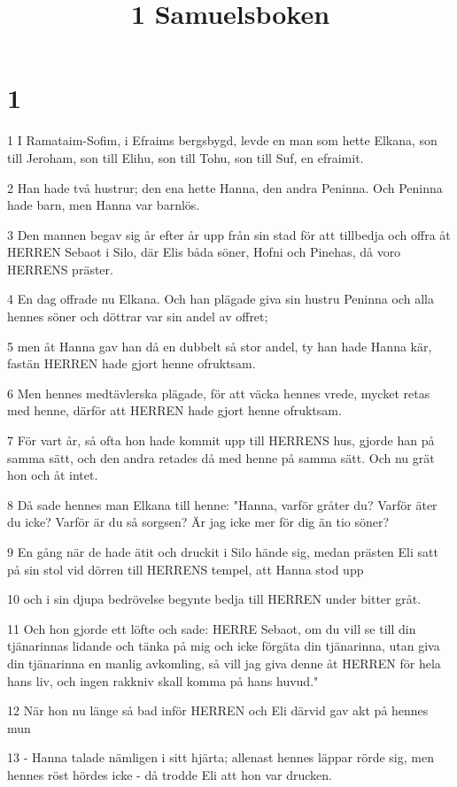 

\title{1 Samuelsboken}


\chapter{1}

\par 1 I Ramataim-Sofim, i Efraims bergsbygd, levde en man som hette Elkana, son till Jeroham, son till Elihu, son till Tohu, son till Suf, en efraimit.
\par 2 Han hade två hustrur; den ena hette Hanna, den andra Peninna. Och Peninna hade barn, men Hanna var barnlös.
\par 3 Den mannen begav sig år efter år upp från sin stad för att tillbedja och offra åt HERREN Sebaot i Silo, där Elis båda söner, Hofni och Pinehas, då voro HERRENS präster.
\par 4 En dag offrade nu Elkana. Och han plägade giva sin hustru Peninna och alla hennes söner och döttrar var sin andel av offret;
\par 5 men åt Hanna gav han då en dubbelt så stor andel, ty han hade Hanna kär, fastän HERREN hade gjort henne ofruktsam.
\par 6 Men hennes medtävlerska plägade, för att väcka hennes vrede, mycket retas med henne, därför att HERREN hade gjort henne ofruktsam.
\par 7 För vart år, så ofta hon hade kommit upp till HERRENS hus, gjorde han på samma sätt, och den andra retades då med henne på samma sätt. Och nu grät hon och åt intet.
\par 8 Då sade hennes man Elkana till henne: "Hanna, varför gråter du? Varför äter du icke? Varför är du så sorgsen? Är jag icke mer för dig än tio söner?
\par 9 En gång när de hade ätit och druckit i Silo hände sig, medan prästen Eli satt på sin stol vid dörren till HERRENS tempel, att Hanna stod upp
\par 10 och i sin djupa bedrövelse begynte bedja till HERREN under bitter gråt.
\par 11 Och hon gjorde ett löfte och sade: HERRE Sebaot, om du vill se till din tjänarinnas lidande och tänka på mig och icke förgäta din tjänarinna, utan giva din tjänarinna en manlig avkomling, så vill jag giva denne åt HERREN för hela hans liv, och ingen rakkniv skall komma på hans huvud."
\par 12 När hon nu länge så bad inför HERREN och Eli därvid gav akt på hennes mun
\par 13 - Hanna talade nämligen i sitt hjärta; allenast hennes läppar rörde sig, men hennes röst hördes icke - då trodde Eli att hon var drucken.
